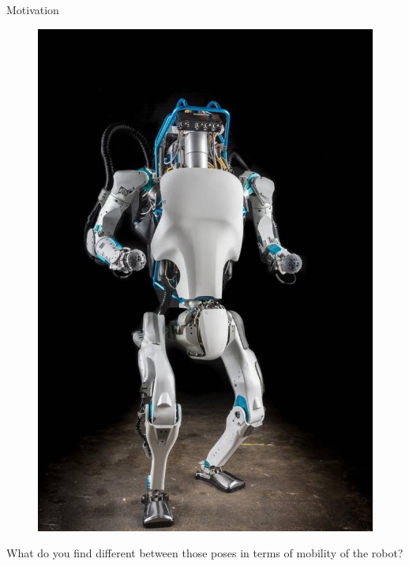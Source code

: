\documentclass{beamer}
\begin{document}
\begin{frame}{Motivation}
\begin{flushleft}
\begin{figure}
  \includegraphics[width=\linewidth]{Atlas_from_boston_dynamics.jpg}
\endminipage

\end{figure}

\bigskip

What do you find different between those poses in terms of mobility of the robot? 

\end{flushleft}
\end{frame}
\end{document}
